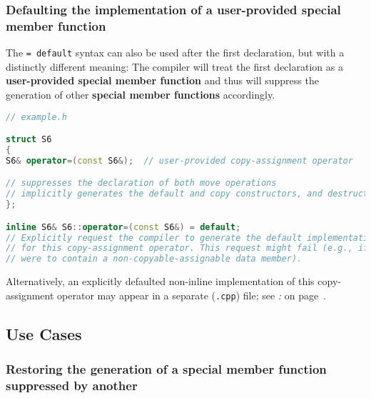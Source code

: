 \subsubsection[Defaulting the implementation of a user-provided special member function]{Defaulting the implementation of a user-provided special member function}\label{defaulting-the-implementation-of-a-user-provided-special-member-function}

The \texttt{=}~\texttt{default} syntax can also be used after the first
declaration, but with a distinctly different meaning: The compiler will
treat the first declaration as a \textbf{user-provided special member
function} and thus will suppress the generation of other
\textbf{special member functions} accordingly.

\begin{lstlisting}[language=C++,label=default-exampleh-code]
// example.h

struct S6
{
S6& operator=(const S6&);  // user-provided copy-assignment operator

// suppresses the declaration of both move operations
// implicitly generates the default and copy constructors, and destructor
};

inline S6& S6::operator=(const S6&) = default;
// Explicitly request the compiler to generate the default implementation
// for this copy-assignment operator. This request might fail (e.g., if (ù{\codeincomments{S6}}ù)
// were to contain a non-copyable-assignable data member).
\end{lstlisting}

\noindent Alternatively, an explicitly defaulted non-inline implementation of this
copy-assignment operator may appear in a separate (\texttt{.cpp}) file;
see {\it{}: } on page~\pageref{physically-decoupling-the-interface-from-the-implementation}.

\subsection[Use Cases]{Use Cases}\label{default-use-cases}

\subsubsection[Restoring the generation of a special member function suppressed by another]{Restoring the generation of a special member function suppressed by another}\label{restoring-the-generation-of-a-special-member-function-suppressed-by-another}

